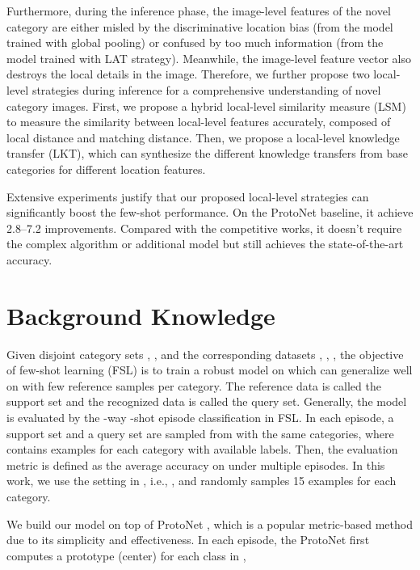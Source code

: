\documentclass{article}
\begin{document}
Furthermore, during the inference phase, the image-level features of the novel category are either misled by the discriminative location bias (from the model trained with global pooling) or confused by too much information (from the model trained with LAT strategy). Meanwhile, the image-level feature vector also destroys the local details in the image. Therefore, we further propose two local-level strategies during inference for a comprehensive understanding of novel category images. First, we propose a hybrid local-level similarity measure (LSM) to measure the similarity between local-level features accurately, composed of local distance and matching distance. Then, we propose a local-level knowledge transfer (LKT), which can synthesize the different knowledge transfers from base categories for different location features.

Extensive experiments justify that our proposed local-level strategies can significantly boost the few-shot performance. On the ProtoNet \cite{snell2017prototypical} baseline, it achieve 2.8–7.2 improvements. Compared with the competitive works, it doesn't require the complex algorithm \cite{zhang2020deepemd} or additional model \cite{multi-pro, ye2020set} but still achieves the state-of-the-art accuracy.


\section{Background Knowledge}
\label{sec:preliminary}

Given disjoint category sets , ,  and the corresponding datasets , , , the objective of few-shot learning (FSL) is to train a robust model on  which can generalize well on  with few reference samples per category. The reference data is called the support set and the recognized data is called the query set. Generally, the model is evaluated by the -way -shot episode classification \cite{vinyals2016matching} in FSL. In each episode, a support set  and a query set  are sampled from  with the same  categories, where  contains  examples for each category with available labels. Then, the evaluation metric is defined as the average accuracy on  under multiple episodes. In this work, we use the setting in \cite{vinyals2016matching}, i.e., ,  and  randomly samples 15 examples for each category.

We build our model on top of ProtoNet \cite{snell2017prototypical}, which is a popular metric-based method due to its simplicity and effectiveness.
In each episode, the ProtoNet first computes a prototype (center) for each class in ,
\end{document}
